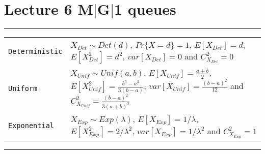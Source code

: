 \section{Lecture 6 M$|$G$|$1 queues}

\hrule
{}
\begin{tabular}{@{}p{\the\MyLen}@{}p{\linewidth-\the\MyLen}@{}}
\verb!Deterministic!	& $X_{Det} \sim Det(d),\ Pr\{X=d\} = 1$, $E[X_{Det}] = d$, $E[X_{Det}^{2}] = d^{2}$, $var[X_{Det}] = 0$ and $C_{X_{Det}}^{2} = 0$\\
\verb!Uniform!	& $X_{Unif} \sim Unif(a, b)$, $E[X_{Unif}] = \frac{a+b}{2}$, $E[X_{Unif}^{2}] = \frac{b^3 - a^3}{3(b-a)}$, $var[X_{Unif}] = \frac{(b-a)^{2}}{12}$ and $C_{X_{Unif}}^{2} = \frac{(b-a)^{2}}{3(a+b)^{2}}$\\
\verb!Exponential!	& $X_{Exp} \sim Exp(\lambda)$, $E[X_{Exp}] = 1/\lambda$, $E[X_{Exp}^{2}] = 2/\lambda^{2}$, $var[X_{Exp}] = 1/\lambda^{2}$ and $C_{X_{Exp}}^{2} = 1$\\
\end{tabular}
\hrule

\blindtext
\blindtext
